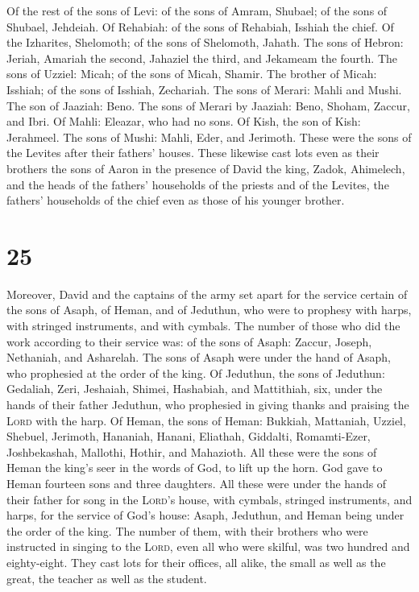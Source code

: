  Of the rest of the sons of Levi: of the sons of Amram,
Shubael; of the sons of Shubael, Jehdeiah.  Of Rehabiah:
of the sons of Rehabiah, Isshiah the chief.  Of the
Izharites, Shelomoth; of the sons of Shelomoth, Jahath. 
The sons of Hebron: Jeriah, Amariah the second, Jahaziel the third, and
Jekameam the fourth.  The sons of Uzziel: Micah; of the
sons of Micah, Shamir.  The brother of Micah: Isshiah; of
the sons of Isshiah, Zechariah.  The sons of Merari:
Mahli and Mushi. The son of Jaaziah: Beno.  The sons of
Merari by Jaaziah: Beno, Shoham, Zaccur, and Ibri.  Of
Mahli: Eleazar, who had no sons.  Of Kish, the son of
Kish: Jerahmeel.  The sons of Mushi: Mahli, Eder, and
Jerimoth. These were the sons of the Levites after their fathers'
houses.  These likewise cast lots even as their brothers
the sons of Aaron in the presence of David the king, Zadok, Ahimelech,
and the heads of the fathers' households of the priests and of the
Levites, the fathers' households of the chief even as those of his
younger brother.

\hypertarget{section-24}{%
\section{25}\label{section-24}}

 Moreover, David and the captains of the army set apart
for the service certain of the sons of Asaph, of Heman, and of Jeduthun,
who were to prophesy with harps, with stringed instruments, and with
cymbals. The number of those who did the work according to their service
was:  of the sons of Asaph: Zaccur, Joseph, Nethaniah, and
Asharelah. The sons of Asaph were under the hand of Asaph, who
prophesied at the order of the king.  Of Jeduthun, the
sons of Jeduthun: Gedaliah, Zeri, Jeshaiah, Shimei, Hashabiah, and
Mattithiah, six, under the hands of their father Jeduthun, who
prophesied in giving thanks and praising the \textsc{Lord} with the
harp.  Of Heman, the sons of Heman: Bukkiah, Mattaniah,
Uzziel, Shebuel, Jerimoth, Hananiah, Hanani, Eliathah, Giddalti,
Romamti-Ezer, Joshbekashah, Mallothi, Hothir, and Mahazioth.
 All these were the sons of Heman the king's seer in the
words of God, to lift up the horn. God gave to Heman fourteen sons and
three daughters.  All these were under the hands of their
father for song in the \textsc{Lord}'s house, with cymbals, stringed
instruments, and harps, for the service of God's house: Asaph, Jeduthun,
and Heman being under the order of the king.  The number
of them, with their brothers who were instructed in singing to the
\textsc{Lord}, even all who were skilful, was two hundred and
eighty-eight.  They cast lots for their offices, all
alike, the small as well as the great, the teacher as well as the
student.

